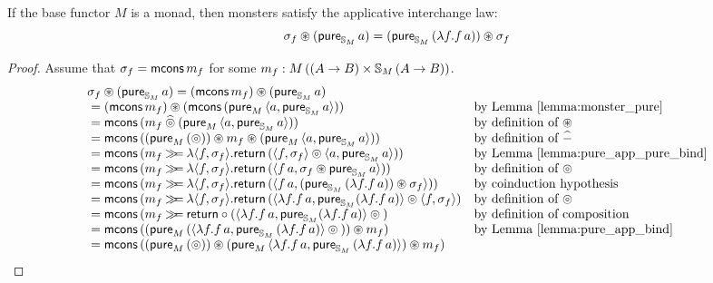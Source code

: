 \begin{lemma}
If the base functor $M$ is a monad, then monsters satisfy the applicative interchange law:
$$
\sigma_f \appl (\apure_{\stream{M}}\,a) = (\apure_{\stream{M}}\,(\lambda f. f\,a)) \appl \sigma_f
$$
\end{lemma}
\begin{proof}
Assume that $\sigma_f = \mcons\,m_f$ for some $m_f:M\,((A\rightarrow B)\times \stream{M}\,(A\rightarrow B))$.
$$
\begin{array}{ll}
\sigma_f \appl (\apure_{\stream{M}}\,a) = (\mcons\,m_f) \appl (\apure_{\stream{M}}\,a) \\
{}= (\mcons\,m_f) \appl (\mcons\,(\apure_M\,\langle a, \apure_{\stream{M}}\,a\rangle))
  & \mbox{by Lemma \ref{lemma:monster_pure}}\\
{}= \mcons\,(m_f \alift{\pappl} (\apure_M\,\langle a, \apure_{\stream{M}}\,a\rangle))
  & \mbox{by definition of }\appl\\
{}= \mcons\,((\apure_M\,(\pappl)) \appl m_f \appl (\apure_M\,\langle a, \apure_{\stream{M}}\,a\rangle))
  & \mbox{by definition of }\alift{-}\\
{}= \mcons\,(m_f \bind \lambda \langle f,\sigma_f\rangle. \return\,(\langle f,\sigma_f\rangle \pappl \langle a, \apure_{\stream{M}}\,a\rangle))
  & \mbox{by Lemma \ref{lemma:pure_app_pure_bind}} \\
{}= \mcons\,(m_f \bind \lambda \langle f,\sigma_f\rangle. \return\,(\langle f\,a,\sigma_f \appl \apure_{\stream{M}}\,a\rangle))
  & \mbox{by definition of }\pappl \\
{}= \mcons\,(m_f \bind \lambda \langle f,\sigma_f\rangle. \return\,(\langle f\,a,(\apure_{\stream{M}}\,(\lambda f. f\,a)) \appl \sigma_f\rangle))
  & \mbox{by coinduction hypothesis} \\
{}= \mcons\,(m_f \bind \lambda \langle f,\sigma_f\rangle. \return\,
       (\langle \lambda f. f\,a, \apure_{\stream{M}} (\lambda f. f\,a) \rangle \pappl \langle f,\sigma_f \rangle)
  & \mbox{by definition of }\pappl \\
{}= \mcons\,(m_f \bind \return\comp
       (\langle \lambda f. f\,a, \apure_{\stream{M}} (\lambda f. f\,a) \rangle \pappl {})
  & \mbox{by definition of composition}\\
{}= \mcons\,((\apure_M\,(\langle \lambda f. f\,a, \apure_{\stream{M}}\,(\lambda f. f\,a)  \rangle\pappl{})) \appl m_f)
  & \mbox{by Lemma \ref{lemma:pure_app_bind}}\\
{}= \mcons\,((\apure_M\,(\pappl)) \appl (\apure_M\,\langle \lambda f. f\,a, \apure_{\stream{M}}\,(\lambda f. f\,a)  \rangle) \appl m_f)

\end{array}$$
\end{proof}
